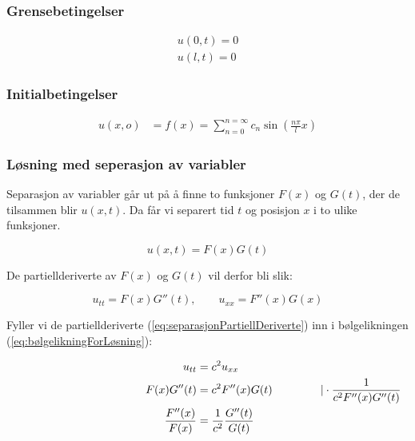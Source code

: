 \subsubsection{Grensebetingelser}

\begin{align}
	u(0 , t) = 0 \label{eq:grensebetingelse0}\\
	u(l , t) = 0 \label{eq:grensebetingelsel}
\end{align}

\subsubsection{Initialbetingelser}

\begin{align}
	u(x , o) &= f(x) = \sum_{n=0}^{n=\infty} c_n \sin \left( \frac{n \pi}{l} x \right) 	
	\label{eq:initialbetingelse1}
\end{align}

\subsubsection{Løsning med seperasjon av variabler}

Separasjon av variabler går ut på å finne to funksjoner $F(x)$ og $G(t)$, der de tilsammen blir $u(x , t)$. 
Da får vi separert tid $t$ og posisjon $x$ i to ulike funksjoner.

\begin{equation}
	u(x , t) = F(x)G(t)
	\label{eq:uSeparertPåFOgG}	
\end{equation}

De partiellderiverte av $F(x)$ og $G(t)$ vil derfor bli slik:

\begin{equation}
	u_{tt} = F(x)G''(t), \qquad u_{xx} = F''(x)G(x)
	\label{eq:separasjonPartiellDeriverte}	
\end{equation}

Fyller vi de partiellderiverte (\ref{eq:separasjonPartiellDeriverte}) inn i bølgelikningen (\ref{eq:bølgelikningForLøsning}):

\begin{align*}
  \hspace{35ex}
  u_{tt} &= c^2 u_{xx} \\
  \hspace{2ex} F(x)G''(t) &= c^2 F''(x)G(t) \hspace{10ex} \vert 
  \cdot \frac{1}{c^2 F''(x) G''(t)} \\
  \frac{F''(x)}{F(x)} &= \frac{1}{c^2} \frac{G''(t)}{G(t)}
\end{align*}

